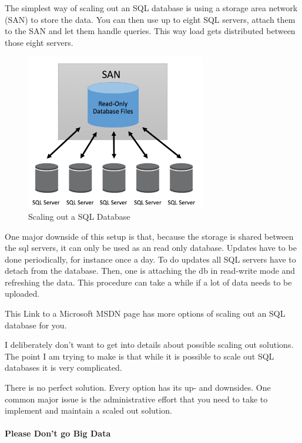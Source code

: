 \documentclass[12pt]{scrartcl} %
\begin{document}
The simplest way of scaling out an SQL database is using a storage area network (SAN) to store the data. You can then use up to eight SQL servers, attach them to the SAN and let them handle queries. This way load gets distributed between those eight servers.

\begin{figure}[htbp]
  \centering
     \includegraphics[width=0.7\textwidth]{images/SQL-Scaling-Out}
  \caption{Scaling out a SQL Database}
  \label{fig:Bild1}
\end{figure}

One major downside of this setup is that, because the storage is shared between the sql servers, it can only be used as an read only database. Updates have to be done periodically, for instance once a day. To do updates all SQL servers have to detach from the database. Then, one is attaching the db in read-write mode and refreshing the data. This procedure can take a while if a lot of data needs to be uploaded.

This Link to a Microsoft MSDN page has more options of scaling out an SQL database for you.

I deliberately don’t want to get into details about possible scaling out solutions. The point I am trying to make is that while it is possible to scale out SQL databases it is very complicated.

There is no perfect solution. Every option has its up- and downsides. One common major issue is the administrative effort that you need to take to implement and maintain a scaled out solution.

\paragraph{Please Don’t go Big Data}
\end{document}
